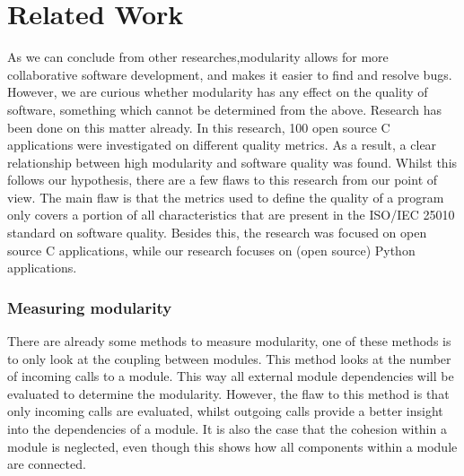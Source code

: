 \documentclass[twoside]{uva-inf-bachelor-thesis}
\begin{document}
\chapter{Related Work}
As we can conclude from other researches\cite{LinuxKernel,lee2000linux},modularity allows for more collaborative software development, and makes it easier to find and resolve bugs. However, we are curious whether modularity has any effect on the quality of software, something which cannot be determined from the above. Research has been done on this matter already\cite{stamelos2002code}. In this research, 100 open source C applications were investigated on different quality metrics. As a result, a clear relationship between high modularity and software quality was found. Whilst this follows our hypothesis, there are a few flaws to this research from our point of view. The main flaw is that the metrics used to define the quality of a program only covers a portion of all characteristics that are present in the ISO/IEC 25010 standard on software quality\cite{ISO25010}. Besides this, the research was focused on open source C applications, while our research focuses on (open source) Python applications.

\subsection*{Measuring modularity}
There are already some methods to measure modularity, one of these methods is to only look at the coupling between modules\cite{BetterCodeHub,visser2016building}. This method looks at the number of incoming calls to a module. This way all external module dependencies will be evaluated to determine the modularity. However, the flaw to this method is that only incoming calls are evaluated, whilst outgoing calls provide a better insight into the dependencies of a module. It is also the case that the cohesion within a module is neglected, even though this shows how all components within a module are connected.
\end{document}
